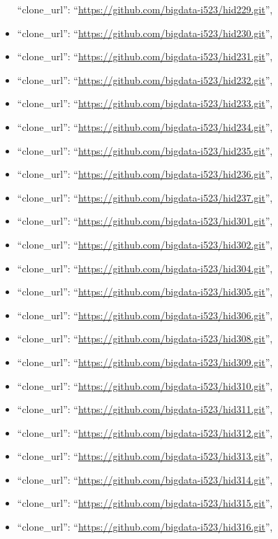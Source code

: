 \begin{itemize}
  ``clone\_url'': ``\url{https://github.com/bigdata-i523/hid229.git}'',
\item
  ``clone\_url'': ``\url{https://github.com/bigdata-i523/hid230.git}'',
\item
  ``clone\_url'': ``\url{https://github.com/bigdata-i523/hid231.git}'',
\item
  ``clone\_url'': ``\url{https://github.com/bigdata-i523/hid232.git}'',
\item
  ``clone\_url'': ``\url{https://github.com/bigdata-i523/hid233.git}'',
\item
  ``clone\_url'': ``\url{https://github.com/bigdata-i523/hid234.git}'',
\item
  ``clone\_url'': ``\url{https://github.com/bigdata-i523/hid235.git}'',
\item
  ``clone\_url'': ``\url{https://github.com/bigdata-i523/hid236.git}'',
\item
  ``clone\_url'': ``\url{https://github.com/bigdata-i523/hid237.git}'',
\item
  ``clone\_url'': ``\url{https://github.com/bigdata-i523/hid301.git}'',
\item
  ``clone\_url'': ``\url{https://github.com/bigdata-i523/hid302.git}'',
\item
  ``clone\_url'': ``\url{https://github.com/bigdata-i523/hid304.git}'',
\item
  ``clone\_url'': ``\url{https://github.com/bigdata-i523/hid305.git}'',
\item
  ``clone\_url'': ``\url{https://github.com/bigdata-i523/hid306.git}'',
\item
  ``clone\_url'': ``\url{https://github.com/bigdata-i523/hid308.git}'',
\item
  ``clone\_url'': ``\url{https://github.com/bigdata-i523/hid309.git}'',
\item
  ``clone\_url'': ``\url{https://github.com/bigdata-i523/hid310.git}'',
\item
  ``clone\_url'': ``\url{https://github.com/bigdata-i523/hid311.git}'',
\item
  ``clone\_url'': ``\url{https://github.com/bigdata-i523/hid312.git}'',
\item
  ``clone\_url'': ``\url{https://github.com/bigdata-i523/hid313.git}'',
\item
  ``clone\_url'': ``\url{https://github.com/bigdata-i523/hid314.git}'',
\item
  ``clone\_url'': ``\url{https://github.com/bigdata-i523/hid315.git}'',
\item
  ``clone\_url'': ``\url{https://github.com/bigdata-i523/hid316.git}'',

\end{itemize}
